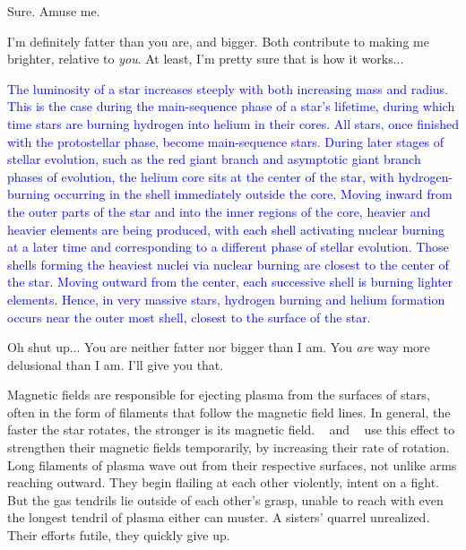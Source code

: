 \documentclass[main.tex]{subfiles}
\begin{document}
\par \Alcyone Sure.  Amuse me.

\par \Taygete I'm definitely fatter than you are, and bigger.  Both contribute to making me brighter, relative to \textit{you}.  At least, I'm pretty sure that is how it works...  

\begin{tcolorbox}[sharp corners, colback=blue!30, colframe=blue!80!blue, title=Dependence of Luminosity on Mass and Radius]
\par \textcolor{blue} {The luminosity of a star increases steeply with both increasing mass and radius.  This is the case during the main-sequence phase of a star's lifetime, during which time stars are burning hydrogen into helium in their cores.  All stars, once finished with the protostellar phase, become main-sequence stars.  During later stages of stellar evolution, such as the red giant branch and asymptotic giant branch phases of evolution, the helium core sits at the center of the star, with hydrogen-burning occurring in the shell immediately outside the core.  Moving inward from the outer parts of the star and into the inner regions of the core, heavier and heavier elements are being produced, with each shell activating nuclear burning at a later time and corresponding to a different phase of stellar evolution.  Those shells forming the heaviest nuclei via nuclear burning are closest to the center of the star.  Moving outward from the center, each successive shell is burning lighter elements.  Hence, in very massive stars, hydrogen burning and helium formation occurs near the outer most shell, closest to the surface of the star.}
\end{tcolorbox}


\par \Alcyone Oh shut up...  You are neither fatter nor bigger than I am.  You \textit{are} way more delusional than I am.  I'll give you that.

\par \nar Magnetic fields are responsible for ejecting plasma from the surfaces of stars, often in the form of filaments that follow the magnetic field lines.  In general, the faster the star rotates, the stronger is its magnetic field.  \rmtaygete~ and \rmalcyone~ use this effect to strengthen their magnetic fields temporarily, by increasing their rate of rotation.  Long filaments of plasma wave out from their respective surfaces, not unlike arms reaching outward.  They begin flailing at each other violently, intent on a fight.  But the gas tendrils lie outside of each other's grasp, unable to reach with even the longest tendril of plasma either can muster.  A sisters' quarrel unrealized.  Their efforts futile, they quickly give up.  
\end{document}
